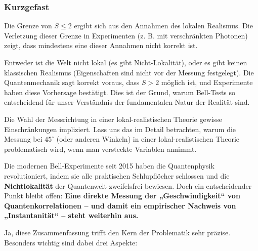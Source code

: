 \documentclass[12pt,a4paper]{article}
\begin{document}
	\subsubsection{Kurzgefast}
	Die Grenze von \(S \leq 2\) ergibt sich aus den Annahmen des lokalen Realismus. Die Verletzung dieser Grenze in Experimenten (z. B. mit verschränkten Photonen) zeigt, dass mindestens eine dieser Annahmen nicht korrekt ist.
	
	
	
	Entweder ist die Welt nicht lokal (es gibt Nicht-Lokalität), oder es gibt keinen klassischen Realismus (Eigenschaften sind nicht vor der Messung festgelegt). Die Quantenmechanik sagt korrekt voraus, dass $S > 2$ möglich ist, und Experimente haben diese Vorhersage bestätigt. Dies ist der Grund, warum Bell-Tests so entscheidend für unser Verständnis der fundamentalen Natur der Realität sind. 
	
	Die Wahl der Messrichtung in einer lokal-realistischen Theorie gewisse Einschränkungen impliziert. Lass uns das im Detail betrachten, warum die Messung bei $45^\circ$ (oder anderen Winkeln) in einer lokal-realistischen Theorie problematisch wird, wenn man versteckte Variablen annimmt.
	
	


Die modernen Bell-Experimente seit 2015 haben die Quantenphysik revolutioniert, indem sie alle praktischen Schlupflöcher schlossen und die \textbf{Nichtlokalität} der Quantenwelt zweifelsfrei bewiesen. Doch ein entscheidender Punkt bleibt offen:  
\textbf{Eine direkte Messung der „Geschwindigkeit“ von Quantenkorrelationen – und damit ein empirischer Nachweis von „Instantanität“ – steht weiterhin aus.}

Ja, diese Zusammenfassung trifft den Kern der Problematik sehr präzise. Besonders wichtig sind dabei drei Aspekte:
\end{document}
